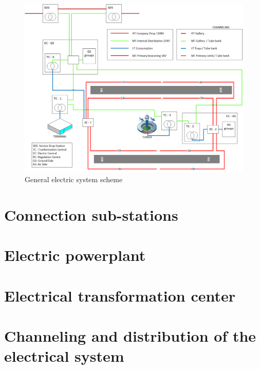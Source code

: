 	\begin{figure}[H]
		\centering
		\includegraphics[clip, trim=0cm 0cm 0cm 0cm, width=1.15\textwidth]{./images/electric/esquema_electrico.png}
		\caption{General electric system scheme}
		\label{electricScheme}
	\end{figure}
	
	
	\section{Connection sub-stations}
	
	\section{Electric powerplant}
	
	\section{Electrical transformation center}
	
	\section{Channeling and distribution of the electrical system}
	